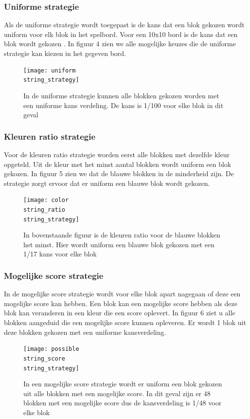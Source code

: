 \documentclass[12pt,a4paper,oneside]{book}
\theoremstyle{definition}
\begin{document}
\subsubsection{Uniforme strategie}
Als de uniforme strategie wordt toegepast is de kans dat een blok gekozen wordt uniform voor elk blok in het spelbord. Voor een 10x10 bord is de kans dat een blok wordt gekozen . In figuur 4 zien we alle mogelijke keuzes die de uniforme strategie kan kiezen in het gegeven bord.
\begin{figure}
	\centering
	\texttt{[image: uniform\\string\_strategy]}
	\caption{In de uniforme strategie kunnen alle blokken gekozen worden met een uniforme kans verdeling. De kans is 1/100 voor elke blok in dit geval}
	\label{figure:initialboard}
\end{figure}

\subsubsection{Kleuren ratio strategie}
Voor de kleuren ratio strategie worden eerst alle blokken met dezelfde kleur opgeteld. Uit de kleur met het minst aantal blokken wordt uniform een blok gekozen. In figuur 5 zien we dat de blauwe blokken in de minderheid zijn. De strategie zorgt ervoor dat er uniform een blauwe blok wordt gekozen.
\begin{figure}
	\centering
	\texttt{[image: color\\string\_ratio\\string\_strategy]}
	\caption{In bovenstaande figuur is de kleuren ratio voor de blauwe blokken het minst. Hier wordt uniform een blauwe blok gekozen met een 1/17 kans voor elke blok}
	\label{figure:initialboard}
\end{figure}

\subsubsection{Mogelijke score strategie}
In de mogelijke score strategie wordt voor elke blok apart nagegaan of deze een mogelijke score kan hebben. Een blok kan een mogelijke score hebben als deze blok kan veranderen in een kleur die een score oplevert. In figuur 6 ziet u alle blokken aangeduid die een mogelijke score kunnen opleveren. Er wordt 1 blok uit deze blokken gekozen met een uniforme kansverdeling.
\begin{figure}
	\centering
	\texttt{[image: possible\\string\_score\\string\_strategy]}
	\caption{In een mogelijke score strategie wordt er uniform een blok gekozen uit alle blokken met een mogelijke score. In dit geval zijn er 48 blokken met een mogelijke score dus de kansverdeling is 1/48 voor elke blok}
	\label{figure:initialboard}
\end{figure}
\end{document}
